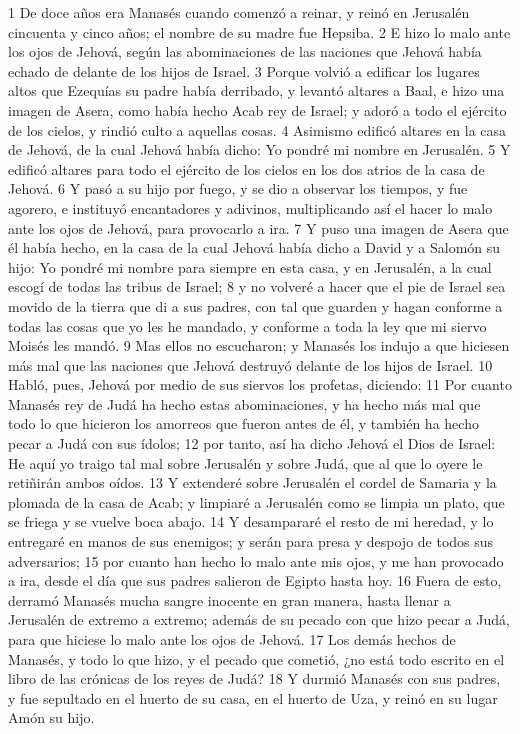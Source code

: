 1 De doce años era Manasés cuando comenzó a reinar, y reinó en Jerusalén cincuenta y cinco años; el nombre de su madre fue Hepsiba.
2 E hizo lo malo ante los ojos de Jehová, según las abominaciones de las naciones que Jehová había echado de delante de los hijos de Israel.
3 Porque volvió a edificar los lugares altos que Ezequías su padre había derribado, y levantó altares a Baal, e hizo una imagen de Asera, como había hecho Acab rey de Israel; y adoró a todo el ejército de los cielos, y rindió culto a aquellas cosas.
4 Asimismo edificó altares en la casa de Jehová, de la cual Jehová había dicho: Yo pondré mi nombre en Jerusalén. 
5 Y edificó altares para todo el ejército de los cielos en los dos atrios de la casa de Jehová.
6 Y pasó a su hijo por fuego, y se dio a observar los tiempos, y fue agorero, e instituyó encantadores y adivinos, multiplicando así el hacer lo malo ante los ojos de Jehová, para provocarlo a ira.
7 Y puso una imagen de Asera que él había hecho, en la casa de la cual Jehová había dicho a David y a Salomón su hijo: Yo pondré mi nombre para siempre en esta casa, y en Jerusalén, a la cual escogí de todas las tribus de Israel;
8 y no volveré a hacer que el pie de Israel sea movido de la tierra que di a sus padres, con tal que guarden y hagan conforme a todas las cosas que yo les he mandado, y conforme a toda la ley que mi siervo Moisés les mandó. 
9 Mas ellos no escucharon; y Manasés los indujo a que hiciesen más mal que las naciones que Jehová destruyó delante de los hijos de Israel.
10 Habló, pues, Jehová por medio de sus siervos los profetas, diciendo:
11 Por cuanto Manasés rey de Judá ha hecho estas abominaciones, y ha hecho más mal que todo lo que hicieron los amorreos que fueron antes de él, y también ha hecho pecar a Judá con sus ídolos;
12 por tanto, así ha dicho Jehová el Dios de Israel: He aquí yo traigo tal mal sobre Jerusalén y sobre Judá, que al que lo oyere le retiñirán ambos oídos.
13 Y extenderé sobre Jerusalén el cordel de Samaria y la plomada de la casa de Acab; y limpiaré a Jerusalén como se limpia un plato, que se friega y se vuelve boca abajo.
14 Y desampararé el resto de mi heredad, y lo entregaré en manos de sus enemigos; y serán para presa y despojo de todos sus adversarios;
15 por cuanto han hecho lo malo ante mis ojos, y me han provocado a ira, desde el día que sus padres salieron de Egipto hasta hoy.
16 Fuera de esto, derramó Manasés mucha sangre inocente en gran manera, hasta llenar a Jerusalén de extremo a extremo; además de su pecado con que hizo pecar a Judá, para que hiciese lo malo ante los ojos de Jehová.
17 Los demás hechos de Manasés, y todo lo que hizo, y el pecado que cometió, ¿no está todo escrito en el libro de las crónicas de los reyes de Judá?
18 Y durmió Manasés con sus padres, y fue sepultado en el huerto de su casa, en el huerto de Uza, y reinó en su lugar Amón su hijo.
